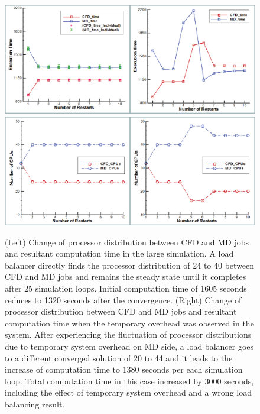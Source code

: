 \documentclass[conference,final]{IEEEtran}
\newcommand{\jhanote}[1]{ {\textcolor{red} { ***Jha: #1 }}}
\newcommand{\jhanote}[1]{}
\begin{document}
\begin{figure}
\centering
\includegraphics[scale=0.3]{BJ_Execution_Large_Time.eps}
\linebreak
\includegraphics[scale=0.3]{BJ_Execution_Large_CPUs.eps}
\caption{\small (Left) Change of processor distribution between CFD and MD jobs and resultant computation time in the large simulation. A load balancer directly finds the processor distribution of 24 to 40 between CFD and MD jobs and remains the steady state until it completes after 25 simulation loops. Initial computation time of 1605 seconds reduces to 1320 seconds after the convergence. (Right) Change of processor distribution between CFD and MD jobs and resultant computation time when the temporary overhead was observed in the system. After experiencing the fluctuation of processor distributions due to temporary system overhead on MD side, a load balancer goes to a different converged solution of 20 to 44 and it leads to the increase of computation time to 1380 seconds per each simulation loop. Total computation time in this case increased by 3000 seconds, including the effect of temporary system overhead and a wrong load balancing result.}
\label{Fig:LBLarge}
\end{figure}


\end{document}
